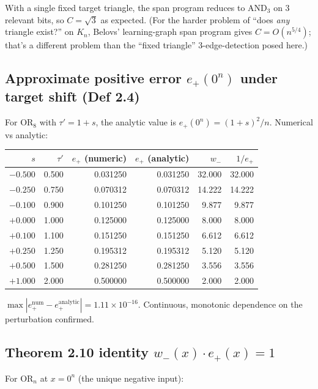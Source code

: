\documentclass[11pt]{article}
\begin{document}
With a single fixed target triangle, the span program reduces to $\mathrm{AND}_3$ on 3 relevant bits, so $C = \sqrt{3}$ as expected. (For the harder problem of ``does \emph{any} triangle exist?'' on $K_n$, Belovs' learning-graph span program gives $C = O(n^{5/4})$; that's a different problem than the ``fixed triangle'' 3-edge-detection posed here.)

\subsection{Approximate positive error $e_+(0^n)$ under target shift (Def 2.4)}

For $\mathrm{OR}_8$ with $\tau' = 1 + s$, the analytic value is $e_+(0^n) = (1+s)^2/n$. Numerical vs analytic:

\begin{center}
\begin{tabular}{@{}rrrrrr@{}}
\toprule
$s$ & $\tau'$ & $e_+$ (numeric) & $e_+$ (analytic) & $w_-$ & $1/e_+$ \\
\midrule
$-0.500$ & 0.500 & 0.031250 & 0.031250 & 32.000 & 32.000 \\
$-0.250$ & 0.750 & 0.070312 & 0.070312 & 14.222 & 14.222 \\
$-0.100$ & 0.900 & 0.101250 & 0.101250 &  9.877 &  9.877 \\
$+0.000$ & 1.000 & 0.125000 & 0.125000 &  8.000 &  8.000 \\
$+0.100$ & 1.100 & 0.151250 & 0.151250 &  6.612 &  6.612 \\
$+0.250$ & 1.250 & 0.195312 & 0.195312 &  5.120 &  5.120 \\
$+0.500$ & 1.500 & 0.281250 & 0.281250 &  3.556 &  3.556 \\
$+1.000$ & 2.000 & 0.500000 & 0.500000 &  2.000 &  2.000 \\
\bottomrule
\end{tabular}
\end{center}

$\max |e_+^\mathrm{num} - e_+^\mathrm{analytic}| = 1.11 \times 10^{-16}$. Continuous, monotonic dependence on the perturbation confirmed.

\subsection{Theorem 2.10 identity $w_-(x)\cdot e_+(x) = 1$}

For $\mathrm{OR}_n$ at $x = 0^n$ (the unique negative input):
\end{document}
